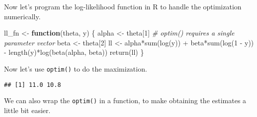 \documentclass[
]{book}
\newenvironment{Shaded}{\begin{snugshade}}{\end{snugshade}}
\newcommand{\AttributeTok}[1]{\textcolor[rgb]{0.77,0.63,0.00}{#1}}
\newcommand{\CommentTok}[1]{\textcolor[rgb]{0.56,0.35,0.01}{\textit{#1}}}
\newcommand{\ControlFlowTok}[1]{\textcolor[rgb]{0.13,0.29,0.53}{\textbf{#1}}}
\newcommand{\DecValTok}[1]{\textcolor[rgb]{0.00,0.00,0.81}{#1}}
\newcommand{\FunctionTok}[1]{\textcolor[rgb]{0.00,0.00,0.00}{#1}}
\newcommand{\NormalTok}[1]{#1}
\newcommand{\OtherTok}[1]{\textcolor[rgb]{0.56,0.35,0.01}{#1}}
\newcommand{\SpecialCharTok}[1]{\textcolor[rgb]{0.00,0.00,0.00}{#1}}
\newcommand{\StringTok}[1]{\textcolor[rgb]{0.31,0.60,0.02}{#1}}
\begin{document}
Now let's program the log-likelihood function in R to handle the
optimization numerically.

\begin{Shaded}
\begin{Highlighting}[]
\NormalTok{ll\_fn }\OtherTok{\textless{}{-}} \ControlFlowTok{function}\NormalTok{(theta, y) \{}
\NormalTok{  alpha }\OtherTok{\textless{}{-}}\NormalTok{ theta[}\DecValTok{1}\NormalTok{]  }\CommentTok{\# optim() requires a single parameter vector}
\NormalTok{  beta }\OtherTok{\textless{}{-}}\NormalTok{ theta[}\DecValTok{2}\NormalTok{]}
\NormalTok{  ll }\OtherTok{\textless{}{-}}\NormalTok{ alpha}\SpecialCharTok{*}\FunctionTok{sum}\NormalTok{(}\FunctionTok{log}\NormalTok{(y)) }\SpecialCharTok{+}\NormalTok{ beta}\SpecialCharTok{*}\FunctionTok{sum}\NormalTok{(}\FunctionTok{log}\NormalTok{(}\DecValTok{1} \SpecialCharTok{{-}}\NormalTok{ y)) }\SpecialCharTok{{-}} 
           \FunctionTok{length}\NormalTok{(y)}\SpecialCharTok{*}\FunctionTok{log}\NormalTok{(}\FunctionTok{beta}\NormalTok{(alpha, beta))}
  \FunctionTok{return}\NormalTok{(ll)}
\NormalTok{\}}
\end{Highlighting}
\end{Shaded}

Now let's use \texttt{optim()} to do the maximization.

\begin{Shaded}
\end{Shaded}

\begin{verbatim}
## [1] 11.0 10.8
\end{verbatim}

We can also wrap the \texttt{optim()} in a function, to make obtaining
the estimates a little bit easier.
\end{document}
